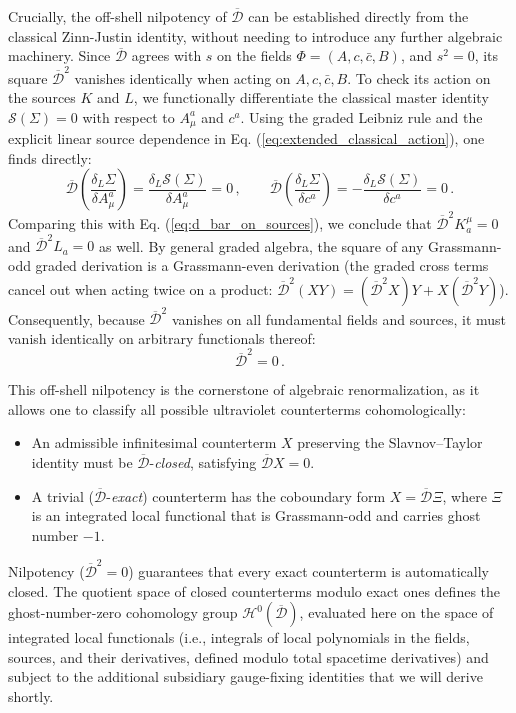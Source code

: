 Crucially, the off-shell nilpotency of \(\overline{\mathcal{D}}\) can be established directly from the classical Zinn-Justin identity, without needing to introduce any further algebraic machinery. Since \(\overline{\mathcal{D}}\) agrees with \(s\) on the fields \(\Phi = (A, c, \bar{c}, B)\), and \(s^2 = 0\), its square \(\overline{\mathcal{D}}^2\) vanishes identically when acting on \(A, c, \bar{c}, B\). To check its action on the sources \(K\) and \(L\), we functionally differentiate the classical master identity \(\mathcal{S}(\Sigma) = 0\) with respect to \(A_\mu^a\) and \(c^a\). Using the graded Leibniz rule and the explicit linear source dependence in Eq. (\ref{eq:extended_classical_action}), one finds directly:
\begin{equation} \label{eq:d_bar_squared_sources_proof}
    \overline{\mathcal{D}} \left( \frac{\delta_L \Sigma}{\delta A_\mu^a} \right) = \frac{\delta_L \mathcal{S}(\Sigma)}{\delta A_\mu^a} = 0 \, , \qquad \overline{\mathcal{D}} \left( \frac{\delta_L \Sigma}{\delta c^a} \right) = -\frac{\delta_L \mathcal{S}(\Sigma)}{\delta c^a} = 0 \, .
\end{equation}
Comparing this with Eq. (\ref{eq:d_bar_on_sources}), we conclude that \(\overline{\mathcal{D}}^2 K_a^\mu = 0\) and \(\overline{\mathcal{D}}^2 L_a = 0\) as well. By general graded algebra, the square of any Grassmann-odd graded derivation is a Grassmann-even derivation (the graded cross terms cancel out when acting twice on a product: \(\overline{\mathcal{D}}^2(XY) = (\overline{\mathcal{D}}^2 X)Y + X(\overline{\mathcal{D}}^2 Y)\)). Consequently, because \(\overline{\mathcal{D}}^2\) vanishes on all fundamental fields and sources, it must vanish identically on arbitrary functionals thereof:
\begin{equation} \label{eq:d_bar_nilpotency}
    \boxed{\overline{\mathcal{D}}^2 = 0} \, .
\end{equation}

This off-shell nilpotency is the cornerstone of algebraic renormalization, as it allows one to classify all possible ultraviolet counterterms cohomologically:
\begin{itemize}
    \item An admissible infinitesimal counterterm \(X\) preserving the Slavnov--Taylor identity must be \(\overline{\mathcal{D}}\)-\textit{closed}, satisfying \(\overline{\mathcal{D}} X = 0\).
    \item A trivial (\(\overline{\mathcal{D}}\)-\textit{exact}) counterterm has the coboundary form \(X = \overline{\mathcal{D}}\Xi\), where \(\Xi\) is an integrated local functional that is Grassmann-odd and carries ghost number \(-1\).
\end{itemize}
Nilpotency (\(\overline{\mathcal{D}}^2 = 0\)) guarantees that every exact counterterm is automatically closed. The quotient space of closed counterterms modulo exact ones defines the ghost-number-zero cohomology group \(\mathcal{H}^0(\overline{\mathcal{D}})\), evaluated here on the space of integrated local functionals (i.e., integrals of local polynomials in the fields, sources, and their derivatives, defined modulo total spacetime derivatives) and subject to the additional subsidiary gauge-fixing identities that we will derive shortly.

